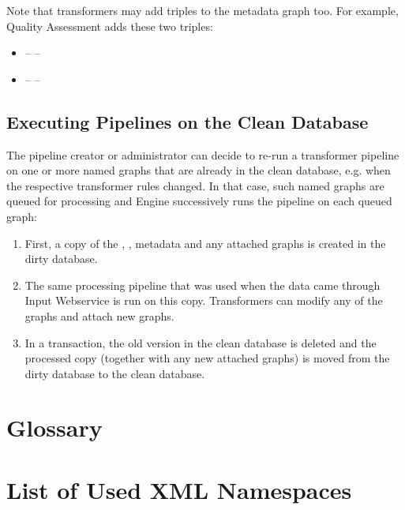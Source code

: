 Note that transformers may add triples to the metadata graph too. For example, Quality Assessment adds these two triples:
\begin{itemize}
  \item {} --  -- 
  \item {} --  -- 
\end{itemize}

\section{Executing Pipelines on the Clean Database}
\label{sec:pipelinesOnCleanDB}

The pipeline creator or administrator  can decide to re-run a transformer pipeline on one or more named graphs that are already in the clean database, e.g. when the respective transformer rules changed. In that case, such named graphs are queued for processing and Engine successively runs the pipeline on each queued graph:

\begin{enumerate}
  \item First, a copy of the , , metadata and any attached graphs is created in the dirty database.
  \item The same processing pipeline that was used when the data came through Input Webservice is run on this copy. Transformers can modify any of the graphs and attach new graphs.
  \item In a transaction, the old version in the clean database is deleted and the processed copy (together with any new attached graphs) is moved from the dirty database to the clean database.
\end{enumerate}

\appendix

\chapter{Glossary}



\chapter{List of Used XML Namespaces}





